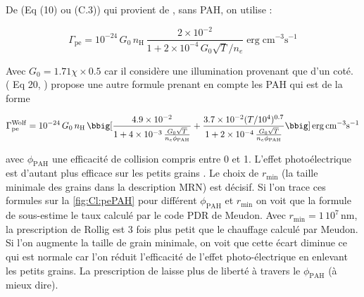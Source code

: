 De \cite{Rollig2005} (Eq (10) ou (C.3)) qui provient de \cite{BakesTielens1994}, sans PAH, on utilise : 

\begin{equation}
    \Gamma_{\mathrm{pe}} = 10^{-24}\,G_0\,n_\mathrm{H}\, \frac{2\times 10^{-2}}{1 + 2\times 10^{-4}\,G_0 \sqrt{T}/n_e} \operatorname{erg} \mathrm{cm}^{-3} \mathrm{s}^{-1}
\end{equation}

Avec $G_0 = 1.71\chi \times 0.5$ car il considère une illumination provenant que d'un coté. (\cite{Wolfire_2003} Eq 20, \cite{BakesTielens1994}) propose une autre formule prenant en compte les PAH qui est de la forme 

\begin{equation}
    \Gamma_{\mathrm{pe}}^{\mathrm{Wolf}} = 10^{-24}\,G_0\,n_\mathrm{H}\, \bbig[ \frac{4.9\times 10^{-2}}{1 + 4\times 10^{-3}\, \frac{G_0 \sqrt{T}}{n_e \phi_\mathrm{PAH}}} + \frac{3.7\times 10^{-2} (T/10^4)^{0.7}}{1 + 2\times 10^{-4}\, \frac{G_0 \sqrt{T}}{n_e \phi_\mathrm{PAH}}} \bbig] \operatorname{erg} \mathrm{cm}^{-3} \mathrm{s}^{-1}
\end{equation}

avec $\phi_\mathrm{PAH}$ une efficacité de collision compris entre 0 et 1. L'effet photoélectrique est d'autant plus efficace sur les petits grains \cite{DraineBook}. Le choix de $r_\mathrm{min}$ (la taille minimale des grains dans la description MRN) est décisif. Si l'on trace ces formules sur la \autoref{fig:Cl:pePAH} pour différent $\phi_\mathrm{PAH}$ et $r_\mathrm{min}$ on voit que la formule de \cite{Rollig2005} sous-estime le taux calculé par le code PDR de Meudon. Avec $r_\mathrm{min} = 1\,10^7\,\mathrm{nm}$, la prescription de Rollig est 3 fois plus petit que le chauffage calculé par Meudon. Si l'on augmente la taille de grain minimale, on voit que cette écart diminue ce qui est normale car l'on réduit l'efficacité de l'effet photo-électrique en enlevant les petits grains. La prescription de \cite{Wolfire_2003} laisse plus de liberté à travers le $\phi_\mathrm{PAH}$ (à mieux dire).

